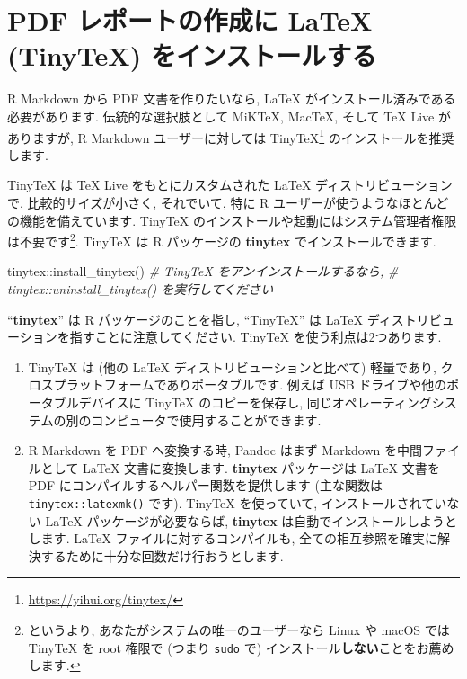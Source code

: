 \documentclass[
  11pt,
  lualatex,ja=standard,jafont=noto]{bxjsreport}
\newenvironment{Shaded}{\begin{snugshade}}{\end{snugshade}}
\newcommand{\CommentTok}[1]{\textcolor[rgb]{0.56,0.35,0.01}{\textit{#1}}}
\newcommand{\FunctionTok}[1]{\textcolor[rgb]{0.00,0.00,0.00}{#1}}
\newcommand{\NormalTok}[1]{#1}
\newcommand{\SpecialCharTok}[1]{\textcolor[rgb]{0.00,0.00,0.00}{#1}}
\renewcommand{\href}[2]{#2\footnote{\url{#1}}}
\begin{document}
\hypertarget{install-latex}{%
\section{PDF レポートの作成に LaTeX (TinyTeX) をインストールする}\label{install-latex}}

R Markdown から PDF 文書を作りたいなら, LaTeX がインストール済みである必要があります. 伝統的な選択肢として MiKTeX, MacTeX, そして TeX Live がありますが, R Markdown ユーザーに対しては \href{https://yihui.org/tinytex/}{TinyTeX} のインストールを推奨します.

TinyTeX は TeX Live をもとにカスタムされた LaTeX ディストリビューションで, 比較的サイズが小さく, それでいて, 特に R ユーザーが使うようなほとんどの機能を備えています. TinyTeX のインストールや起動にはシステム管理者権限は不要です\footnote{というより, あなたがシステムの唯一のユーザーなら Linux や macOS では TinyTeX を root 権限で (つまり \texttt{sudo} で) インストール\textbf{しない}ことをお薦めします.}. TinyTeX は R パッケージの \textbf{tinytex} \autocite{R-tinytex} でインストールできます.

\begin{Shaded}
\begin{Highlighting}[numbers=left,,]
\NormalTok{tinytex}\SpecialCharTok{::}\FunctionTok{install\_tinytex}\NormalTok{()}
\CommentTok{\# TinyTeX をアンインストールするなら,}
\CommentTok{\# tinytex::uninstall\_tinytex() を実行してください}
\end{Highlighting}
\end{Shaded}

``\textbf{tinytex}'' は R パッケージのことを指し, ``TinyTeX'' は LaTeX ディストリビューションを指すことに注意してください. TinyTeX を使う利点は2つあります.

\begin{enumerate}
\def\labelenumi{\arabic{enumi}.}
\item
  TinyTeX は (他の LaTeX ディストリビューションと比べて) 軽量であり, クロスプラットフォームでありポータブルです. 例えば USB ドライブや他のポータブルデバイスに TinyTeX のコピーを保存し, 同じオペレーティングシステムの別のコンピュータで使用することができます.
\item
  R Markdown を PDF へ変換する時, Pandoc はまず Markdown を中間ファイルとして LaTeX 文書に変換します. \textbf{tinytex} パッケージは LaTeX 文書を PDF にコンパイルするヘルパー関数を提供します (主な関数は \texttt{tinytex::latexmk()} です). TinyTeX を使っていて, インストールされていない LaTeX パッケージが必要ならば, \textbf{tinytex} は自動でインストールしようとします. LaTeX ファイルに対するコンパイルも, 全ての相互参照を確実に解決するために十分な回数だけ行おうとします.
\end{enumerate}
\end{document}
